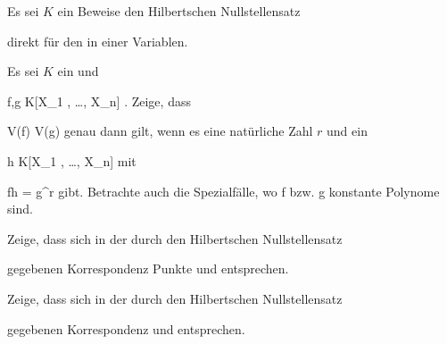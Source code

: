 \setcounter{section}{11}







{}
{





Es sei $K$ ein
Beweise
den
Hilbertschen Nullstellensatz

direkt für den
in einer Variablen.





}
{} {}

{}
{





Es sei $K$ ein
und

\mavergleichskette
{\vergleichskette
{ f,g
}
{ \in }{ K[X_1 , \ldots , X_n]
}
{  }{
}
{    }{
}
{   }{
}
}
{}{}{.}
Zeige, dass

\mavergleichskette
{\vergleichskette
{V(f)
}
{ \subseteq }{ V(g)
}
{  }{
}
{    }{
}
{   }{
}
}
{}{}{}
genau dann gilt, wenn es eine natürliche Zahl $r$ und ein

\mavergleichskette
{\vergleichskette
{ h
}
{ \in }{ K[X_1 , \ldots , X_n]
}
{  }{
}
{    }{
}
{   }{
}
}
{}{}{}
mit

\mavergleichskette
{\vergleichskette
{ fh
}
{ = }{ g^r
}
{  }{
}
{    }{
}
{   }{
}
}
{}{}{}
gibt. Betrachte auch die Spezialfälle, wo
\mathkor {} {f} {bzw.} {g} {}
konstante Polynome sind.





}
{} {}

{}
{





Zeige, dass sich in der durch
den
Hilbertschen Nullstellensatz

gegebenen Korrespondenz Punkte und
entsprechen.





}
{} {}

{}
{





Zeige, dass sich in der durch
den
Hilbertschen Nullstellensatz

gegebenen Korrespondenz
und
entsprechen.





}
{} {}

